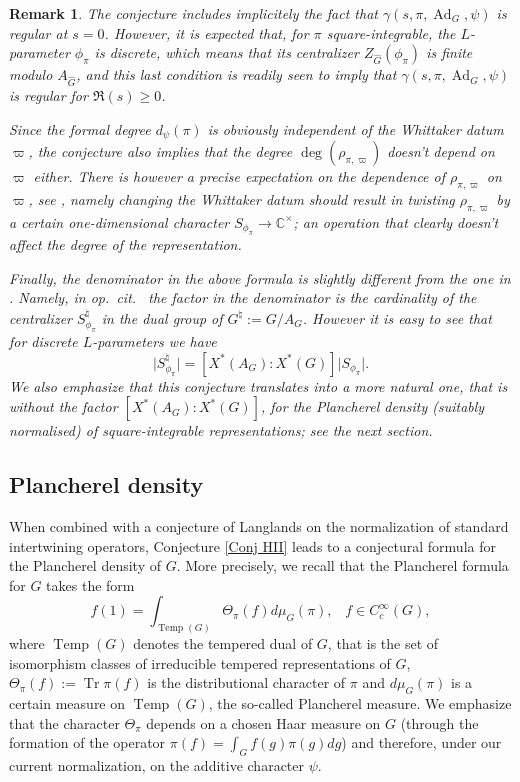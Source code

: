 \documentclass[12pt]{article}
\newtheorem{rem}{Remark}[section]
\numberwithin{equation}{section}
\def\bC{\mathbb{C}}
\DeclareMathOperator{\Tra}{Tr}
\DeclareMathOperator{\Temp}{Temp}
\DeclareMathOperator{\Ad}{Ad}
\begin{document}
\begin{rem}
The conjecture includes implicitely the fact that $\gamma(s,\pi,\Ad_G,\psi)$ is regular at $s=0$. However, it is expected that, for $\pi$ square-integrable, the $L$-parameter $\phi_\pi$ is discrete, which means that its centralizer $Z_{\widehat{G}}(\phi_\pi)$ is finite modulo $A_{\widehat{G}}$, and this last condition is readily seen to imply that $\gamma(s,\pi,\Ad_G,\psi)$ is regular for $\Re(s)\geq 0$.

Since the formal degree $d_\psi(\pi)$ is obviously independent of the Whittaker datum $\varpi$, the conjecture also implies that the degree $\deg(\rho_{\pi,\varpi})$ doesn't depend on $\varpi$ either. There is however a precise expectation on the dependence of $\rho_{\pi,\varpi}$ on $\varpi$, see \cite[\S 9, (3)]{GGP}, namely changing the Whittaker datum should result in twisting $\rho_{\pi,\varpi}$ by a certain one-dimensional character $S_{\phi_\pi}\to \bC^\times$; an operation that clearly doesn't affect the degree of the representation.

Finally, the denominator in the above formula is slightly different from the one in \cite{HII}. Namely, in {\em op.\ cit.\ } the factor in the denominator is the cardinality of the centralizer $S_{\phi_\pi}^\natural$ in the dual group of $G^\natural:=G/A_G$. However it is easy to see that for discrete $L$-parameters we have
$$\displaystyle \lvert S_{\phi_\pi}^\natural\rvert=[X^*(A_G):X^*(G)]\lvert S_{\phi_\pi}\rvert.$$ 
We also emphasize that this conjecture translates into a more natural one, that is without the factor $[X^*(A_G):X^*(G)]$, for the Plancherel density (suitably normalised) of square-integrable representations; see the next section.
\end{rem}

\subsection{Plancherel density}

When combined with a conjecture of Langlands \cite[Appendix II]{LangEis} on the normalization of standard intertwining operators, Conjecture \ref{Conj HII} leads to a conjectural formula for the Plancherel density of $G$. More precisely, we recall that the Plancherel formula for $G$ takes the form \cite{WaldPlanch}
$$\displaystyle f(1)=\int_{\Temp(G)} \Theta_\pi(f) d\mu_G(\pi),\;\;\; f\in C_c^\infty(G),$$
where $\Temp(G)$ denotes the tempered dual of $G$, that is the set of isomorphism classes of irreducible tempered representations of $G$, $\Theta_\pi(f):=\Tra \pi(f)$ is the distributional character of $\pi$ and $d\mu_G(\pi)$ is a certain measure on $\Temp(G)$, the so-called Plancherel measure. We emphasize that the character $\Theta_\pi$ depends on a chosen Haar measure on $G$ (through the formation of the operator $\pi(f)=\int_G f(g)\pi(g)dg$) and therefore, under our current normalization, on the additive character $\psi$.
\end{document}
